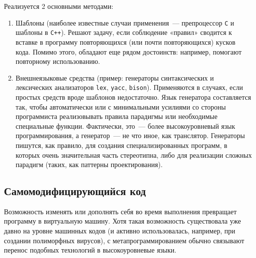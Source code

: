 \documentclass[a4paper,10pt]{article}
\begin{document}
Реализуется 2 основными методами:
\begin{enumerate}
   \item Шаблоны (наиболее известные случаи применения~--- препроцессор {\tt C} и шаблоны в {\tt C++}).
      Решают задачу, если соблюдение «правил» сводится к вставке в программу повторяющихся (или почти повторяющихся) кусков кода. Помимо
      этого, обладают еще рядом достоинств: например, помогают повторному использованию.

   \item Внешнеязыковые средства (пример: генераторы синтаксических и лексических анализаторов {\tt lex}, {\tt yacc}, {\tt bison}).
    Применяются в случаях, если простых средств вроде шаблонов недостаточно. Язык генератора составляется так, чтобы автоматически или с
    минимальными усилиями со стороны программиста реализовывать правила парадигмы или необходимые специальные функции. Фактически, это~--- 
    более высокоуровневый язык программирования, а генератор~---  не что иное, как транслятор. Генераторы пишутся, как правило, для создания
    специализированных программ, в которых очень значительная часть стереотипна, либо для реализации сложных парадигм (таких, как паттерны
    проектирования).
\end{enumerate}


\subsection{Самомодифицирующийся код}
Возможность изменять или дополнять себя во время выполнения превращает программу в виртуальную машину. Хотя такая возможность существовала
уже давно на уровне машинных кодов (и активно использовалась, например, при создании полиморфных вирусов), с метапрограммированием обычно
связывают перенос подобных технологий в высокоуровневые языки.
\end{document}

